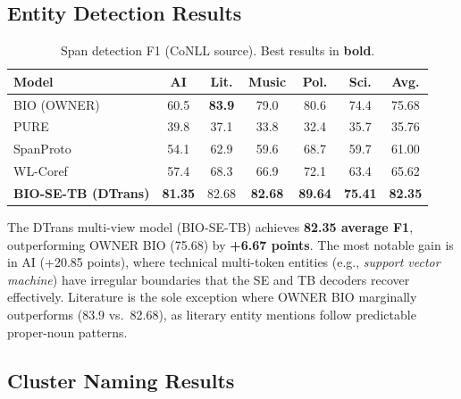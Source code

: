 \documentclass[11pt,a4paper]{article}
\begin{document}
\subsection{Entity Detection Results}

\begin{table}[H]
\centering
\footnotesize
\caption{Span detection F1 (CoNLL source). Best results in \textbf{bold}.}
\label{tab:detection}
\begin{tabular}{l|c|c|c|c|c|c}
\toprule
\textbf{Model} & \textbf{AI} & \textbf{Lit.} & \textbf{Music} & \textbf{Pol.} & \textbf{Sci.} & \textbf{Avg.} \\
\midrule
BIO (OWNER)    & 60.5  & \textbf{83.9} & 79.0  & 80.6  & 74.4  & 75.68 \\
PURE           & 39.8  & 37.1 & 33.8  & 32.4  & 35.7  & 35.76 \\
SpanProto      & 54.1  & 62.9 & 59.6  & 68.7  & 59.7  & 61.00 \\
WL-Coref       & 57.4  & 68.3 & 66.9  & 72.1  & 63.4  & 65.62 \\
\textbf{BIO-SE-TB (DTrans)} & \textbf{81.35} & 82.68 & \textbf{82.68} & \textbf{89.64} & \textbf{75.41} & \textbf{82.35} \\
\bottomrule
\end{tabular}
\end{table}

The DTrans multi-view model (BIO-SE-TB) achieves \textbf{82.35 average F1}, outperforming OWNER BIO (75.68) by \textbf{+6.67 points}. The most notable gain is in AI (+20.85 points), where technical multi-token entities (e.g., \textit{support vector machine}) have irregular boundaries that the SE and TB decoders recover effectively. Literature is the sole exception where OWNER BIO marginally outperforms (83.9 vs.\ 82.68), as literary entity mentions follow predictable proper-noun patterns.

\subsection{Cluster Naming Results}
\end{document}
